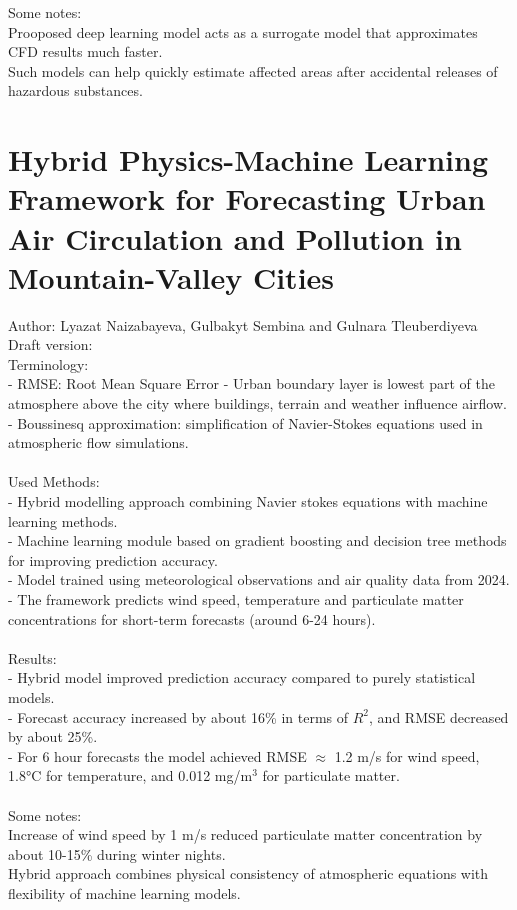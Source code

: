 \documentclass[12pt,a4paper]{article}
\begin{document}
Some notes:\\
Prooposed deep learning model acts as a surrogate model that approximates CFD results much faster. \\
Such models can help quickly estimate affected areas after accidental releases of hazardous substances. \\


\section{Hybrid Physics-Machine Learning Framework for Forecasting
Urban Air Circulation and Pollution in Mountain-Valley Cities}

Author: Lyazat Naizabayeva, Gulbakyt Sembina and Gulnara Tleuberdiyeva
Draft version:\\

Terminology: \\
- RMSE: Root Mean Square Error
- Urban boundary layer is lowest part of the atmosphere above the city where buildings, terrain and weather influence airflow. \\
- Boussinesq approximation: simplification of Navier-Stokes equations used in atmospheric flow simulations. \\
\\

Used Methods: \\
- Hybrid modelling approach combining Navier  stokes equations with machine learning methods. \\
- Machine learning module based on gradient boosting and decision tree methods for improving prediction accuracy. \\
- Model trained using meteorological observations and air quality data from 2024. \\
- The framework predicts wind speed, temperature and particulate matter concentrations for short-term forecasts (around 6-24 hours). \\
\\

Results: \\
- Hybrid model improved prediction accuracy compared to purely statistical models. \\
- Forecast accuracy increased by about 16\% in terms of $R^2$, and RMSE decreased by about 25\%. \\
- For 6 hour forecasts the model achieved RMSE $\approx$ 1.2 m/s for wind speed, 1.8°C for temperature, and 0.012 mg/m$^3$ for particulate matter. \\
\\

Some notes:\\
Increase of wind speed by 1 m/s reduced particulate matter concentration by about 10-15\% during winter nights. \\
Hybrid approach combines physical consistency of atmospheric equations with flexibility of machine learning models. \\
\end{document}
